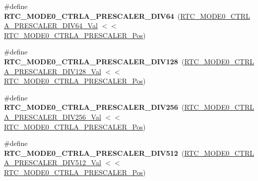 \begin{DoxyCompactItemize}
\item 
\hypertarget{group___s_a_m_l21___r_t_c_ga25778cdaf83339eeda3a4153bd878a80}{}\#define {\bfseries R\+T\+C\+\_\+\+M\+O\+D\+E0\+\_\+\+C\+T\+R\+L\+A\+\_\+\+P\+R\+E\+S\+C\+A\+L\+E\+R\+\_\+\+D\+I\+V64}~(\hyperlink{group___s_a_m_l21___r_t_c_gaa32300dbb23ae91a202b4ac7ec93890a}{R\+T\+C\+\_\+\+M\+O\+D\+E0\+\_\+\+C\+T\+R\+L\+A\+\_\+\+P\+R\+E\+S\+C\+A\+L\+E\+R\+\_\+\+D\+I\+V64\+\_\+\+Val} $<$$<$ \hyperlink{group___s_a_m_l21___r_t_c_ga0dbb76324e6c9c6d9391c96723e6e59b}{R\+T\+C\+\_\+\+M\+O\+D\+E0\+\_\+\+C\+T\+R\+L\+A\+\_\+\+P\+R\+E\+S\+C\+A\+L\+E\+R\+\_\+\+Pos})\label{group___s_a_m_l21___r_t_c_ga25778cdaf83339eeda3a4153bd878a80}

\item 
\hypertarget{group___s_a_m_l21___r_t_c_ga4ebf3c23aab3157417128d3c3b76c3c5}{}\#define {\bfseries R\+T\+C\+\_\+\+M\+O\+D\+E0\+\_\+\+C\+T\+R\+L\+A\+\_\+\+P\+R\+E\+S\+C\+A\+L\+E\+R\+\_\+\+D\+I\+V128}~(\hyperlink{group___s_a_m_l21___r_t_c_ga23ef8b1e57fbbbfa3b245d49f7c6a771}{R\+T\+C\+\_\+\+M\+O\+D\+E0\+\_\+\+C\+T\+R\+L\+A\+\_\+\+P\+R\+E\+S\+C\+A\+L\+E\+R\+\_\+\+D\+I\+V128\+\_\+\+Val} $<$$<$ \hyperlink{group___s_a_m_l21___r_t_c_ga0dbb76324e6c9c6d9391c96723e6e59b}{R\+T\+C\+\_\+\+M\+O\+D\+E0\+\_\+\+C\+T\+R\+L\+A\+\_\+\+P\+R\+E\+S\+C\+A\+L\+E\+R\+\_\+\+Pos})\label{group___s_a_m_l21___r_t_c_ga4ebf3c23aab3157417128d3c3b76c3c5}

\item 
\hypertarget{group___s_a_m_l21___r_t_c_ga7847c6808b714cdb98bed06203d85b7b}{}\#define {\bfseries R\+T\+C\+\_\+\+M\+O\+D\+E0\+\_\+\+C\+T\+R\+L\+A\+\_\+\+P\+R\+E\+S\+C\+A\+L\+E\+R\+\_\+\+D\+I\+V256}~(\hyperlink{group___s_a_m_l21___r_t_c_gadf29384af5ecfe99cbd4a5574d52438b}{R\+T\+C\+\_\+\+M\+O\+D\+E0\+\_\+\+C\+T\+R\+L\+A\+\_\+\+P\+R\+E\+S\+C\+A\+L\+E\+R\+\_\+\+D\+I\+V256\+\_\+\+Val} $<$$<$ \hyperlink{group___s_a_m_l21___r_t_c_ga0dbb76324e6c9c6d9391c96723e6e59b}{R\+T\+C\+\_\+\+M\+O\+D\+E0\+\_\+\+C\+T\+R\+L\+A\+\_\+\+P\+R\+E\+S\+C\+A\+L\+E\+R\+\_\+\+Pos})\label{group___s_a_m_l21___r_t_c_ga7847c6808b714cdb98bed06203d85b7b}

\item 
\hypertarget{group___s_a_m_l21___r_t_c_ga4486d1b1174b0023482a76c6f1df295c}{}\#define {\bfseries R\+T\+C\+\_\+\+M\+O\+D\+E0\+\_\+\+C\+T\+R\+L\+A\+\_\+\+P\+R\+E\+S\+C\+A\+L\+E\+R\+\_\+\+D\+I\+V512}~(\hyperlink{group___s_a_m_l21___r_t_c_gaa8e3801e4c7a53b5c6f9843391199140}{R\+T\+C\+\_\+\+M\+O\+D\+E0\+\_\+\+C\+T\+R\+L\+A\+\_\+\+P\+R\+E\+S\+C\+A\+L\+E\+R\+\_\+\+D\+I\+V512\+\_\+\+Val} $<$$<$ \hyperlink{group___s_a_m_l21___r_t_c_ga0dbb76324e6c9c6d9391c96723e6e59b}{R\+T\+C\+\_\+\+M\+O\+D\+E0\+\_\+\+C\+T\+R\+L\+A\+\_\+\+P\+R\+E\+S\+C\+A\+L\+E\+R\+\_\+\+Pos})\label{group___s_a_m_l21___r_t_c_ga4486d1b1174b0023482a76c6f1df295c}


\end{DoxyCompactItemize}
